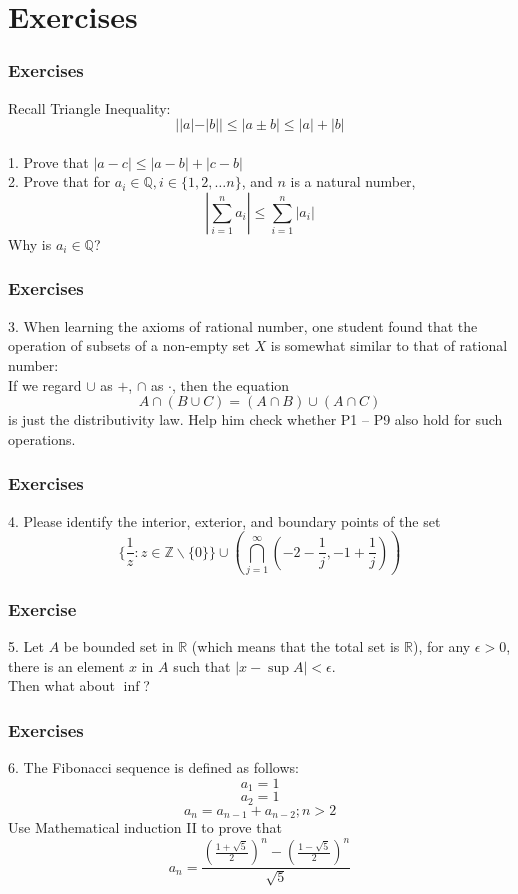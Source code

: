 \documentclass{beamer}
\begin{document}
\section{Exercises}
\begin{frame}
    \frametitle{Exercises}
    Recall Triangle Inequality:\\
    
    $$||a|-|b||\leq |a\pm b| \leq |a|+|b|$$\\
    \vspace{1em}
    1. Prove that $|a-c|\leq |a-b|+|c-b|$\\
    \vspace{1em}
    2. Prove that for $a_i \in \mathbb{Q}, i \in \{1,2,\dots n\}$, and $n$
    is a natural number,
    $$|\sum_{i=1}^n a_i|\leq \sum_{i=1}^n |a_i|$$
    Why is $a_i \in \mathbb{Q}$?
\end{frame}
\begin{frame}
    \frametitle{Exercises}
3. When learning the axioms of rational number, one student found that the operation of subsets of a non-empty 
set $X$ is somewhat similar to that of rational number:\\
\vspace{1em}
If we regard $\cup$ as $+$, $\cap$ as $\cdot$, then the equation 
\begin{equation*}
    A\cap(B\cup C)=(A\cap B)\cup(A\cap C)
\end{equation*}
is just the distributivity law. Help him  check whether P1 -- P9 also hold for such operations.
\end{frame}
\begin{frame}
    \frametitle{Exercises}
    4. Please identify the interior, exterior, and boundary
    points of the set
    $$\{\frac{1}{z}:z\in \mathbb{Z}\backslash\{0\}\}\cup (\bigcap_{j=1}^\infty(-2-\frac{1}{j},-1+\frac{1}{j}))$$
\end{frame}
\begin{frame}
    \frametitle{Exercise}
5. Let $A$ be bounded set in $\mathbb{R}$ (which means that the total set is $\mathbb{R}$), for any $\epsilon>0$, 
there is an element $x$ in $A$ such that $|x-\sup A|<\epsilon$.
\\
\vspace{2em}
Then what about $\inf$?
\end{frame}
\begin{frame}
    \frametitle{Exercises}
    6. The Fibonacci sequence is defined as follows:
    $$a_1=1$$
    $$a_2=1$$
    $$a_n=a_{n-1}+a_{n-2};n>2$$
    Use Mathematical induction II to prove that 
    $$a_n=\frac{(\frac{1+\sqrt{5}}{2})^n-(\frac{1-\sqrt{5}}{2})^n}{\sqrt{5}}$$
\end{frame}
\end{document}
